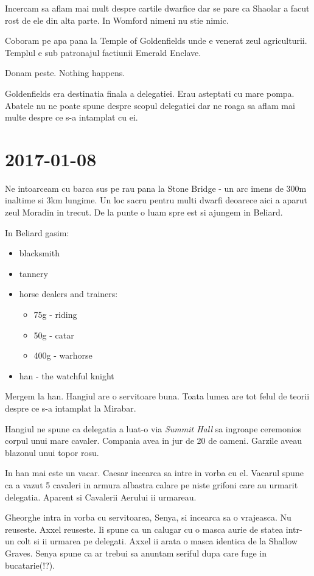 \documentclass[12pt,oneside]{book}
\begin{document}
Incercam sa aflam mai mult despre cartile dwarfice dar se pare ca Shaolar a
facut rost de ele din alta parte. In Womford nimeni nu stie nimic.

Coboram pe apa pana la Temple of Goldenfields unde e venerat zeul 
agriculturii. Templul e sub patronajul factiunii Emerald Enclave. 

Donam peste. Nothing happens.

Goldenfields era destinatia finala a delegatiei. Erau asteptati cu mare
pompa. Abatele nu ne poate spune despre scopul delegatiei dar ne roaga
sa aflam mai multe despre ce s-a intamplat cu ei. 

\section{2017-01-08}

Ne intoarceam cu barca sus pe rau pana la Stone Bridge - un arc imens de 300m
inaltime si 3km lungime. Un loc sacru pentru multi dwarfi deoarece aici a aparut
zeul Moradin in trecut.
De la punte o luam spre est si ajungem in Beliard.

In Beliard gasim:
\begin{itemize}
	\item blacksmith
	\item tannery
	\item horse dealers and trainers:
		\begin{itemize}
			\item 75g - riding
			\item 50g - catar
			\item 400g - warhorse
		\end{itemize}
	\item han - the watchful knight
\end{itemize}

Mergem la han. Hangiul are o servitoare buna.
Toata lumea are tot felul de teorii despre ce s-a intamplat la Mirabar.

Hangiul ne spune ca delegatia a luat-o via \textit{Summit Hall} sa ingroape 
ceremonios corpul unui mare cavaler. Compania avea in jur de 20 de oameni. Garzile 
aveau blazonul unui topor rosu.

In han mai este un vacar. Caesar incearca sa intre in vorba cu el.
Vacarul spune ca a vazut 5 cavaleri in armura albastra calare pe niste 
grifoni care au urmarit delegatia. Aparent si Cavalerii Aerului ii urmareau.

Gheorghe intra in vorba cu servitoarea, Senya, si incearca sa o vrajeasca. Nu reuseste.
Axxel reuseste. Ii spune ca un calugar cu o masca aurie de statea intr-un colt si ii 
urmarea pe delegati. Axxel ii arata o masca identica de la Shallow Graves. Senya spune ca 
ar trebui sa anuntam seriful dupa care fuge in bucatarie(!?).
\end{document}
